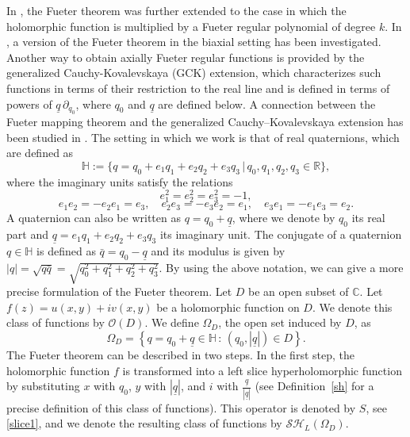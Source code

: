 \documentclass[reqno,11pt]{amsart}
\numberwithin{equation}{section}
\theoremstyle{definition}
\begin{document}
In \cite{KQS, PQS}, the Fueter theorem was further extended to the case in which the holomorphic function is multiplied by a Fueter regular polynomial of degree $k$. In \cite{Elb}, a version of the Fueter theorem in the biaxial setting has been investigated.
\newline
\newline
Another way to obtain axially Fueter regular functions is provided by the generalized Cauchy-Kovalevskaya (GCK) extension, which characterizes such functions in terms of their restriction to the real line and is defined in terms of powers of $\underline{q}\,\partial_{q_0}$, where $q_0$ and $\underline{q}$ are defined below. A connection between the Fueter mapping theorem and the generalized Cauchy--Kovalevskaya extension has been studied in \cite{DDG, DDG1}.
\newline
\newline
The setting in which we work is that of real quaternions, which are defined as
$$ \mathbb{H}:= \{q=q_0+e_1 q_1+e_2 q_2+e_3q_3 \, | \, q_0, q_1, q_2, q_3 \in \mathbb{R}\},$$
where the imaginary units satisfy the relations
$$ e_1^2=e_2^2=e_3^2=-1,$$
$$ e_1 e_2=-e_2e_1=e_3, \quad e_2e_3=-e_3 e_2=e_1, \quad  e_3e_1=-e_1e_3=e_2.$$
A quaternion can also be written as $q=q_0+ \underline{q}$, where we denote by $q_0$ its real part and $\underline{q}=e_1 q_1+e_2q_2+e_3 q_3$ its imaginary unit. The conjugate of a quaternion $q \in \mathbb{H}$ is defined as $\bar q=q_0-\underline{q}$ and its modulus is given by
$|q|=\sqrt{q \bar{q}}=\sqrt{q_0^2+q_1^2+q_2^2+q_3^2}$.
\newline
\newline
By using the above notation, we can give a more precise formulation of the Fueter theorem. Let $D$ be an open subset of $\mathbb{C}$. Let $f(z)=u(x,y)+iv(x,y)$ be a holomorphic function on $D$. We denote this class of functions by $ \mathcal{O}(D)$. We define $\Omega_D$, the open set induced by $D$, as
$$
\Omega_D= \left\{ q=q_0+\underline{q} \in \mathbb{H} \,:\, (q_0, |\underline{q}|) \in D \right\}.
$$
The Fueter theorem can be described in two steps. In the first step, the holomorphic function $f$ is transformed into a left slice hyperholomorphic function by substituting $x$ with $q_0$, $y$ with $|\underline{q}|$, and $i$ with $\frac{\underline{q}}{|\underline{q}|}$ (see Definition~\ref{sh} for a precise definition of this class of functions). This operator is denoted by $S$, see \eqref{slice1}, and we denote the resulting class of functions by $\mathcal{SH}_L(\Omega_D)$.
\end{document}
